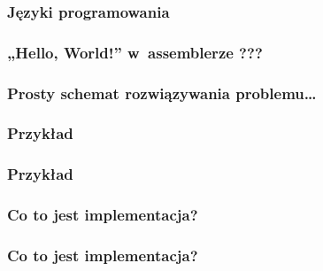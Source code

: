 \documentclass[10pt,t]{beamer}
\begin{document}
\begin{frame}
  \frametitle{Języki programowania}




\end{frame}





\begin{frame}
  \frametitle{„Hello, World!” w~assemblerze ???}



\end{frame}





\begin{frame}
  \frametitle{Prosty schemat rozwiązywania problemu\ldots}




\end{frame}





\begin{frame}
  \frametitle{Przykład}




\end{frame}





\begin{frame}
  \frametitle{Przykład}



\end{frame}





\begin{frame}
  \frametitle{Co to jest implementacja?}




\end{frame}





\begin{frame}
  \frametitle{Co to jest implementacja?}




\end{frame}
\end{document}
